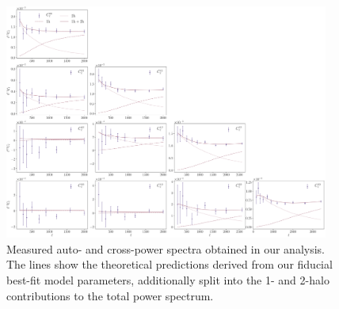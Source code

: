 \documentclass[a4paper,11pt]{article}
\begin{document}
\begin{figure}
\begin{center}
\includegraphics[width=0.95\textwidth]{figures/Cls-data-vs-best-fit_mPk=HOD_fix=alpha-fc-sigmaM_HOD=zevol_fit=pz-shifts+prior=0p2-pz-widths+prior=0p2_fit=auto+cross_cosmo=const_cov=G+NG+SSC-LINBIAS_HOD-param=zfid_clfit=HOD-zevol_1h-2h_lin.pdf}
\caption{Measured auto- and cross-power spectra obtained in our analysis. The lines show the theoretical predictions derived from our fiducial best-fit model parameters, additionally split into the 1- and 2-halo contributions to the total power spectrum.}
\label{fig:cls-best-fit-1h-2h}
\end{center}
\end{figure}  
  
\end{document}
